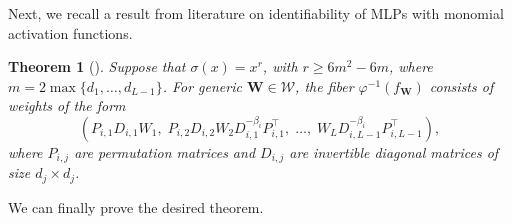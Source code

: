 \documentclass{article} %
\theoremstyle{plain}%
\newtheorem{thm}{Theorem}[section]
\theoremstyle{definition}
\theoremstyle{remark}
\begin{document}
Next, we recall a result from literature on identifiability of MLPs with monomial activation functions. 
\begin{thm}[\cite{finkel2024activation}]
\label{thm:identmon}
Suppose that $\sigma(x) = x^r$, with $r \geq 6m^2 - 6m$, where $m =  2\max\{ d_1,\dots,d_{L-1}\}$. For generic $\mathbf{W} \in \mathcal{W}$, the fiber $\varphi^{-1}(f_\mathbf{W})$ consists of weights of the form
\begin{equation}
\label{eq:fiber_d}
\left(P_{i,1} D_{i,1} W_1,\; P_{i,2} D_{i,2} W_2 D_{i,1}^{-\beta_i} P_{i,1}^\top,\;\dots,\; W_L D_{i,L-1}^{-\beta_i} P_{i,L-1}^\top \right),
\end{equation}
where $P_{i,j}$ are permutation matrices and $D_{i,j}$ are invertible diagonal matrices of size $d_j \times d_j$.
\end{thm}
We can finally prove the desired theorem.
\end{document}
